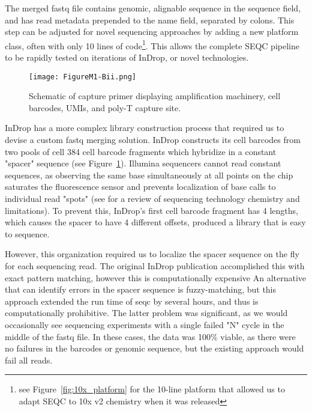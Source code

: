 The merged fastq file contains genomic, alignable sequence in the sequence field, and has read metadata prepended to the name field, separated by colons. This step can be adjusted for novel sequencing approaches by adding a new platform class, often with only 10 lines of code\footnote{see Figure~\ref{fig:10x_platform} for the 10-line platform that allowed us to adapt SEQC to 10x v2 chemistry when it was released}.
This allows the complete SEQC pipeline to be rapidly tested on iterations of InDrop, or novel technologies.

\begin{figure}
\centering
\texttt{[image: FigureM1-Bii.png]}
\caption{Schematic of capture primer displaying amplification machinery, cell barcodes, UMIs,
         and poly-T capture site.}
\label{fig:m1bii}
\end{figure}

InDrop has a more complex library construction process that required us to devise a custom fastq merging solution.
InDrop constructs its cell barcodes from two pools of cell 384 cell barcode fragments which hybridize in a constant "spacer" sequence (see Figure~\ref{fig:m1bii}).
Illumina sequencers cannot read constant sequences, as observing the same base simultaneously at all points on the chip saturates the fluorescence sensor and prevents localization of base calls to individual read "spots" (see \cite{Metzker2010} for a review of sequencing technology chemistry and limitations). 
To prevent this, InDrop's first cell barcode fragment has 4 lengths, which causes the spacer to have 4 different offsets, produced a library that is easy to sequence. 

However, this organization required us to localize the spacer sequence on the fly for each sequencing read. 
The original InDrop publication accomplished this with exact pattern matching, however this is computationally expensive
An alternative that can identify errors in the spacer sequence is fuzzy-matching, but this approach extended the run time of seqc by several hours, and thus is computationally prohibitive.  
The latter problem was significant, as we would occasionally see sequencing experiments with a single failed "N" cycle in the middle of the fastq file. 
In these cases, the data was 100\% viable, as there were no failures in the barcodes or genomic sequence, but the existing approach would fail all reads. 

